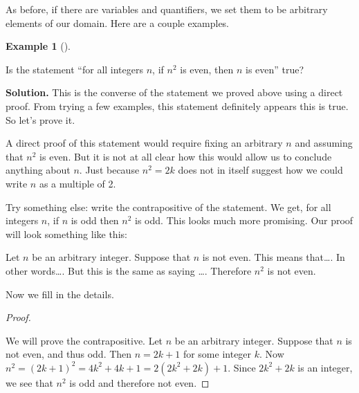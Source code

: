 \documentclass[10pt,]{book}
\theoremstyle{plain}
\theoremstyle{definition}
\newtheorem{example}[theorem]{Example}
\theoremstyle{definition}
\theoremstyle{definition}
\numberwithin{equation}{chapter}
\begin{document}
As before, if there are variables and quantifiers, we set them to be arbitrary elements of our domain. Here are a couple examples.
%
\begin{example}[]\label{example-91}

Is the statement ``for all integers \(n\), if \(n^2\) is even, then \(n\) is even'' true?
%
\par\medskip\noindent%
\textbf{Solution.}\quad
This is the converse of the statement we proved above using a direct proof. From trying a few examples, this statement definitely appears this is true. So let's prove it.
%
\par

A direct proof of this statement would require fixing an arbitrary \(n\) and assuming that \(n^2\) is even. But it is not at all clear how this would allow us to conclude anything about \(n\). Just because \(n^2 = 2k\) does not in itself suggest how we could write \(n\) as a multiple of 2.
%
\par

Try something else: write the contrapositive of the statement. We get, for all integers \(n\), if \(n\) is odd then \(n^2\) is odd. This looks much more promising. Our proof will look something like this:
%
\par

Let \(n\) be an arbitrary integer. Suppose that \(n\) is not even. This means that\dots{}. In other words\dots{}. But this is the same as saying \dots{}. Therefore \(n^2\) is not even.
%
\par

Now we fill in the details.
%
\begin{proof}\hypertarget{proof-35}{}

We will prove the contrapositive. Let \(n\) be an arbitrary integer. Suppose that \(n\) is not even, and thus odd. Then \(n= 2k+1\) for some integer \(k\). Now \(n^2 = (2k+1)^2 = 4k^2 + 4k + 1 = 2(2k^2 + 2k) + 1\). Since \(2k^2 + 2k\) is an integer, we see that \(n^2\) is odd and therefore not even.
%
\end{proof}
\end{example}
\end{document}
